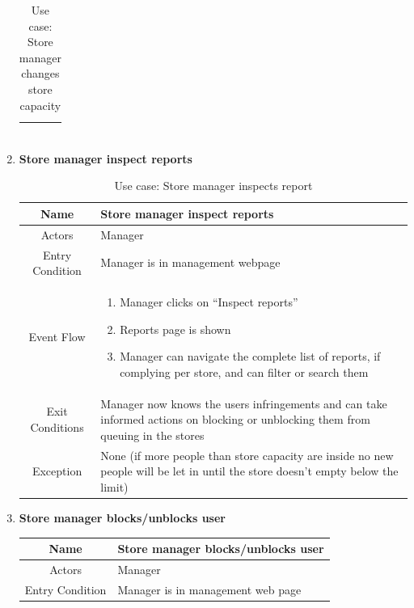 \begin{enumerate}
\begin{table}[H]
{\begin{tabular}{|c|p{14cm}|}
\begin{enumerate}
			\end{enumerate}\\
			
			\hline
		\end{tabular}
	}
	\label{tab:UCManCap}
	\caption{Use case: Store manager changes store capacity}
\end{table}

\item \textbf{Store manager inspect reports}

\begin{table}[H]
	{
		\begin{tabular}{|c|p{14cm}|}
			\hline
			Name & Store manager inspect reports\\
			\hline
			Actors & Manager\\
			\hline
			Entry Condition & Manager is in management webpage\\
			\hline
			
			Event Flow & \begin{enumerate}
				\item Manager clicks on “Inspect reports”
				\item Reports page is shown
				\item Manager can navigate the complete list of reports, if complying per store, and can filter or search them 
				
			\end{enumerate}\\
			
			\hline
			Exit Conditions & Manager now knows the users infringements and can take informed actions on blocking or unblocking them from queuing in the stores\\
			\hline
			
			Exception & None (if more people than store capacity are inside no new people will be let in until the store doesn’t empty below the limit)\\
			
			\hline
		\end{tabular}
	}
	\label{tab:UCManReport}
	\caption{Use case: Store manager inspects report}
\end{table}

\item \textbf{Store manager blocks/unblocks user}

\begin{table}[H]
	{
		\begin{tabular}{|c|p{14cm}|}
			\hline
			Name & Store manager blocks/unblocks user\\
			\hline
			Actors & Manager\\
			\hline
			Entry Condition & Manager is in management web page \\
			\hline
			

\end{tabular}}
\end{table}
\end{enumerate}
